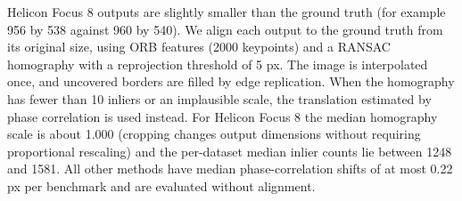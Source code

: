 Helicon Focus 8 outputs are slightly smaller than the ground truth (for example 956 by 538 against 960 by 540). We align each output to the ground truth from its original size, using ORB features (2000 keypoints) and a RANSAC homography with a reprojection threshold of 5 px. The image is interpolated once, and uncovered borders are filled by edge replication. When the homography has fewer than 10 inliers or an implausible scale, the translation estimated by phase correlation is used instead. For Helicon Focus 8 the median homography scale is about 1.000 (cropping changes output dimensions without requiring proportional rescaling) and the per-dataset median inlier counts lie between 1248 and 1581. All other methods have median phase-correlation shifts of at most 0.22 px per benchmark and are evaluated without alignment.
